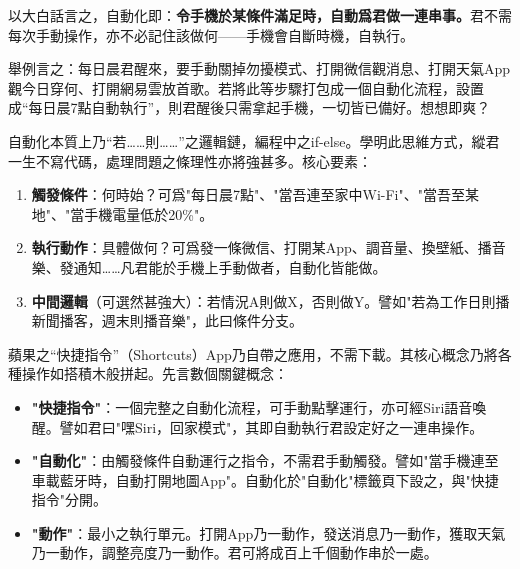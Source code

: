 


以大白話言之，自動化即：\textbf{令手機於某條件滿足時，自動爲君做一連串事。}君不需每次手動操作，亦不必記住該做何——手機會自斷時機，自執行。

舉例言之：每日晨君醒來，要手動關掉勿擾模式、打開微信觀消息、打開天氣App觀今日穿何、打開網易雲放首歌。若將此等步驟打包成一個自動化流程，設置成“每日晨7點自動執行”，則君醒後只需拿起手機，一切皆已備好。想想即爽？

自動化本質上乃“若……則……”之邏輯鏈，編程中之if-else。學明此思維方式，縱君一生不寫代碼，處理問題之條理性亦將強甚多。核心要素：

\begin{enumerate}
  \item \textbf{觸發條件}：何時始？可爲"每日晨7點"、"當吾連至家中Wi-Fi"、"當吾至某地"、"當手機電量低於20\%"。
  \item \textbf{執行動作}：具體做何？可爲發一條微信、打開某App、調音量、換壁紙、播音樂、發通知……凡君能於手機上手動做者，自動化皆能做。
  \item \textbf{中間邏輯}（可選然甚強大）：若情況A則做X，否則做Y。譬如"若為工作日則播新聞播客，週末則播音樂"，此曰條件分支。
\end{enumerate}


蘋果之“快捷指令”（Shortcuts）App乃自帶之應用，不需下載。其核心概念乃將各種操作如搭積木般拼起。先言數個關鍵概念：

\begin{itemize}
  \item \textbf{"快捷指令"}：一個完整之自動化流程，可手動點擊運行，亦可經Siri語音喚醒。譬如君曰"嘿Siri，回家模式"，其即自動執行君設定好之一連串操作。
  \item \textbf{"自動化"}：由觸發條件自動運行之指令，不需君手動觸發。譬如"當手機連至車載藍牙時，自動打開地圖App"。自動化於"自動化"標籤頁下設之，與"快捷指令"分開。
  \item \textbf{"動作"}：最小之執行單元。打開App乃一動作，發送消息乃一動作，獲取天氣乃一動作，調整亮度乃一動作。君可將成百上千個動作串於一處。
\end{itemize}

